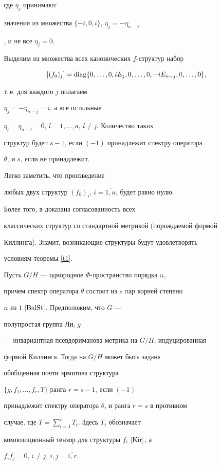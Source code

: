 где $\eta_j$ принимают


значения из множества $\{-i,0,i\}$, $\eta_j=-\eta_{n-j}$


\cite{BalSt}, и не все $\eta_j=0$.





Выделим из множества всех канонических $f$-структур набор


$$


[(f_0)_j]=\diag\{0,\dotsc, 0,iE_j,0,\dotsc,0,-iE_{n-j},


0,\dotsc,0\},


$$


т.\,е. для каждого $j$ полагаем


$\eta_j=-\eta_{n-j}=i$, а все остальные


$\eta_l=\eta_{n-l}=0$, $l=1,\dotsc,a$, $l\neq j$. Количество таких


структур будет $s-1$, если $(-1)$ принадлежит спектру оператора


$\theta$, и $s$, если не принадлежит.





Легко заметить, что произведение


любых двух структур $(f_0)_i$, $i=\overline{1,n}$, будет равно нулю.


Более того, в \cite{Bal} доказана согласованность всех


классических структур со стандартной метрикой (порождаемой формой


Киллинга). Значит, возникающие структуры будут удовлетворять


условиям теоремы \ref{t1}.





\begin{thm}\label{con}


Пусть $G/H$ --- однородное $\Phi$-пространство порядка $n$,


причем спектр оператора $\theta$ состоит из $s$ пар корней степени


$n$ из $1$ $\cite{BalSt}$. Предположим, что $G$ ---


полупростая группа Ли, $g$


--- инвариантная псевдориманова метрика на $G/H$, индуцированная


формой Киллинга. Тогда на $G/H$ может быть задана


обобщенная почти эрмитова структура


$\{g,f_1,\dotsc,f_r,T\}$ ранга $r=s-1$, если $(-1)$


принадлежит спектру оператора $\theta$, и ранга $r=s$ в противном


случае, где $T=\sum\limits_{i=1}^rT_i$. Здесь $T_i$ обозначает


композиционный тензор для структуры $f_i$ $\cite{Kir}$, а


$f_if_j=0$, $i\ne j$, $i,j=\overline{1,r}$.


\end{thm}





